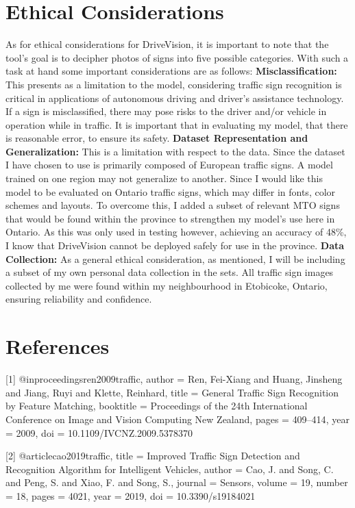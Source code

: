 \documentclass[final]{article}
\begin{document}
\section*{Ethical Considerations}
\vspace*{-0.1in}
As for ethical considerations for DriveVision, it is important to note that the tool’s goal is to decipher photos of signs into five possible categories. With such a task at hand some important considerations are as follows: \textbf{Misclassification:} This presents as a limitation to the model, considering traffic sign recognition is critical in applications of autonomous driving and driver’s assistance technology. If a sign is misclassified, there may pose risks to the driver and/or vehicle in operation while in traffic. It is important that in evaluating my model, that there is reasonable error, to ensure its safety.
\textbf{Dataset Representation and Generalization:} This is a limitation with respect to the data. Since the dataset I have chosen to use is primarily composed of European traffic signs. A model trained on one region may not generalize to another. Since I would like this model to be evaluated on Ontario traffic signs, which may differ in fonts, color schemes and layouts. To overcome this, I added a subset of relevant MTO signs that would be found within the province to strengthen my model's use here in Ontario. As this was only used in testing however, achieving an accuracy of 48\%, I know that DriveVision cannot be deployed safely for use in the province.
\textbf{Data Collection:} As a general ethical consideration, as mentioned, I will be including a subset of my own personal data collection in the sets. All traffic sign images collected by me were found within my neighbourhood in Etobicoke, Ontario, ensuring reliability and confidence.
\newpage
\section*{References}

[1] @inproceedings{ren2009traffic,
  author    = {Ren, Fei-Xiang and Huang, Jinsheng and Jiang, Ruyi and Klette, Reinhard},
  title     = {General Traffic Sign Recognition by Feature Matching},
  booktitle = {Proceedings of the 24th International Conference on Image and Vision Computing New Zealand},
  pages     = {409--414},
  year      = {2009},
  doi       = {10.1109/IVCNZ.2009.5378370}
}

[2] @article{cao2019traffic,
  title   = {Improved Traffic Sign Detection and Recognition Algorithm for Intelligent Vehicles},
  author  = {Cao, J. and Song, C. and Peng, S. and Xiao, F. and Song, S.},
  journal = {Sensors},
  volume  = {19},
  number  = {18},
  pages   = {4021},
  year    = {2019},
  doi     = {10.3390/s19184021}
}
\end{document}
